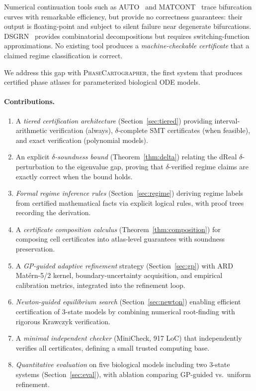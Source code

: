 \documentclass[11pt]{article}
\newcommand{\PC}{\textsc{PhaseCartographer}}
\begin{document}
Numerical continuation tools such as AUTO~\cite{doedel2007auto} and MATCONT~\cite{dhooge2008matcont} trace bifurcation curves with remarkable efficiency, but provide no correctness guarantees: their output is floating-point and subject to silent failure near degenerate bifurcations.
DSGRN~\cite{cummins2016dsgrn} provides combinatorial decompositions but requires switching-function approximations.
No existing tool produces a \emph{machine-checkable certificate} that a claimed regime classification is correct.

We address this gap with \PC{}, the first system that produces certified phase atlases for parameterized biological ODE models.

\paragraph{Contributions.}
\begin{enumerate}[leftmargin=*]
\item A \emph{tiered certification architecture} (Section~\ref{sec:tiered}) providing interval-arithmetic verification (always), $\delta$-complete SMT certificates (when feasible), and exact verification (polynomial models).

\item An explicit \emph{$\delta$-soundness bound} (Theorem~\ref{thm:delta}) relating the dReal $\delta$-perturbation to the eigenvalue gap, proving that $\delta$-verified regime claims are exactly correct when the bound holds.

\item \emph{Formal regime inference rules} (Section~\ref{sec:regime}) deriving regime labels from certified mathematical facts via explicit logical rules, with proof trees recording the derivation.

\item A \emph{certificate composition calculus} (Theorem~\ref{thm:composition}) for composing cell certificates into atlas-level guarantees with soundness preservation.

\item A \emph{GP-guided adaptive refinement} strategy (Section~\ref{sec:gp}) with ARD Mat\'ern-5/2 kernel, boundary-uncertainty acquisition, and empirical calibration metrics, integrated into the refinement loop.

\item \emph{Newton-guided equilibrium search} (Section~\ref{sec:newton}) enabling efficient certification of 3-state models by combining numerical root-finding with rigorous Krawczyk verification.

\item A \emph{minimal independent checker} (MiniCheck, 917 LoC) that independently verifies all certificates, defining a small trusted computing base.

\item \emph{Quantitative evaluation} on five biological models including two 3-state systems (Section~\ref{sec:eval}), with ablation comparing GP-guided vs.\ uniform refinement.
\end{enumerate}
\end{document}
